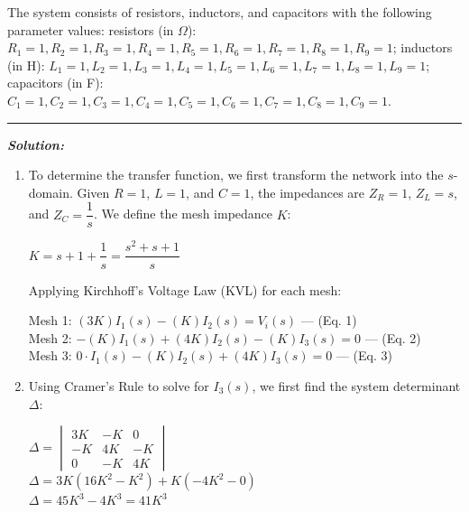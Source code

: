 \documentclass[11pt]{article}
\begin{document}

\noindent The system consists of resistors, inductors, and capacitors with the following parameter values: resistors (in $\Omega$): \( R_1 = 1, R_2 = 1, R_3 = 1, R_4 = 1, R_5 = 1, R_6 = 1, R_7 = 1, R_8 = 1, R_9 = 1 \); inductors (in H): \( L_1 = 1, L_2 = 1, L_3 = 1, L_4 = 1, L_5 = 1, L_6 = 1, L_7 = 1, L_8 = 1, L_9 = 1 \); capacitors (in F): \( C_1 = 1, C_2 = 1, C_3 = 1, C_4 = 1, C_5 = 1, C_6 = 1, C_7 = 1, C_8 = 1, C_9 = 1 \).

\noindent\rule{\textwidth}{1pt}

\vspace{12pt}

\noindent \textbf{\textit{Solution:}}


\begin{enumerate}[label=(\alph*), itemindent=*, leftmargin=*, nolistsep]
	\item To determine the transfer function, we first transform the network into the $s$-domain. Given $R=1$, $L=1$, and $C=1$, the impedances are $Z_R = 1$, $Z_L = s$, and $Z_C = \dfrac{1}{s}$. We define the mesh impedance $K$:
	\begin{center}
		$K = s + 1 + \dfrac{1}{s} = \dfrac{s^2 + s + 1}{s}$
	\end{center}
	
	Applying Kirchhoff’s Voltage Law (KVL) for each mesh:
	\begin{center}
		Mesh 1: $(3K)I_1(s) - (K)I_2(s) = V_i(s)$ \hfill --- (Eq. 1) \\
		\vspace{5pt}
		Mesh 2: $-(K)I_1(s) + (4K)I_2(s) - (K)I_3(s) = 0$ \hfill --- (Eq. 2) \\
		\vspace{5pt}
		Mesh 3: $0 \cdot I_1(s) - (K)I_2(s) + (4K)I_3(s) = 0$ \hfill --- (Eq. 3)
	\end{center}

	\item Using Cramer's Rule to solve for $I_3(s)$, we first find the system determinant $\Delta$:
	\begin{center}
		$\Delta = \begin{vmatrix} 3K & -K & 0 \\ -K & 4K & -K \\ 0 & -K & 4K \end{vmatrix}$ \\
		\vspace{10pt}
		$\Delta = 3K(16K^2 - K^2) + K(-4K^2 - 0)$ \\
		\vspace{10pt}
		$\Delta = 45K^3 - 4K^3 = 41K^3$
	\end{center}


\end{enumerate}
\end{document}
